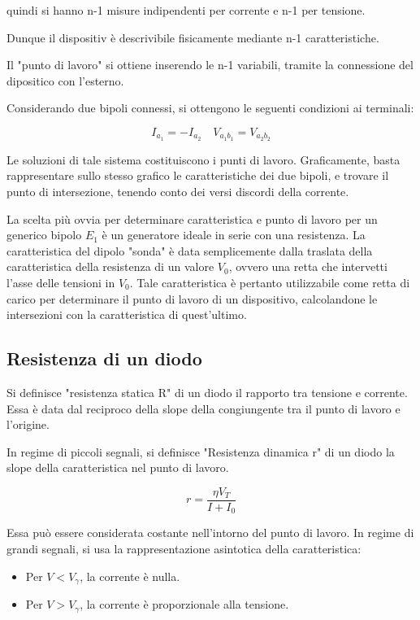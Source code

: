 \documentclass{article}
\begin{document}
quindi si hanno n-1 misure indipendenti per corrente e n-1 per tensione.

Dunque il dispositiv è descrivibile fisicamente mediante n-1 caratteristiche.

Il "punto di lavoro" si ottiene inserendo le n-1 variabili, tramite la connessione del dipositico con l'esterno.

Considerando due bipoli connessi, si ottengono le seguenti condizioni ai terminali:

\begin{equation}
    I_{a_1}=-I_{a_2} \quad V_{a_1b_1}=V_{a_2b_2}
\end{equation}

Le soluzioni di tale sistema costituiscono i punti di lavoro. Graficamente, basta rappresentare sullo stesso grafico
le caratteristiche dei due bipoli, e trovare il punto di intersezione, tenendo conto dei versi discordi della corrente.

La scelta più ovvia per determinare caratteristica e punto di lavoro per un generico bipolo $E_1$ è
un generatore ideale in serie con una resistenza.
La caratteristica del dipolo "sonda" è data semplicemente dalla traslata della caratteristica della resistenza di un valore $V_0$,
ovvero una retta che intervetti l'asse delle tensioni in $V_0$. Tale caratteristica è pertanto utilizzabile come retta di carico per
determinare il punto di lavoro di un dispositivo, calcolandone le intersezioni con la caratteristica di quest'ultimo.

\subsection{Resistenza di un diodo}

Si definisce "resistenza statica R" di un diodo il rapporto tra tensione e corrente.
Essa è data dal reciproco della slope della congiungente tra il punto di lavoro e l'origine.

In regime di piccoli segnali, si definisce "Resistenza dinamica r" di un diodo la slope della caratteristica nel punto di lavoro.

\begin{equation}
    r=\frac{\eta V_T}{I+I_0}
\end{equation}

Essa può essere considerata costante nell'intorno del punto di lavoro.
In regime di grandi segnali, si usa la rappresentazione asintotica della caratteristica:

\begin{itemize}
    \item Per $V<V_\gamma$, la corrente è nulla.
    \item Per $V>V_\gamma$, la corrente è proporzionale alla tensione.
\end{itemize}
\end{document}
